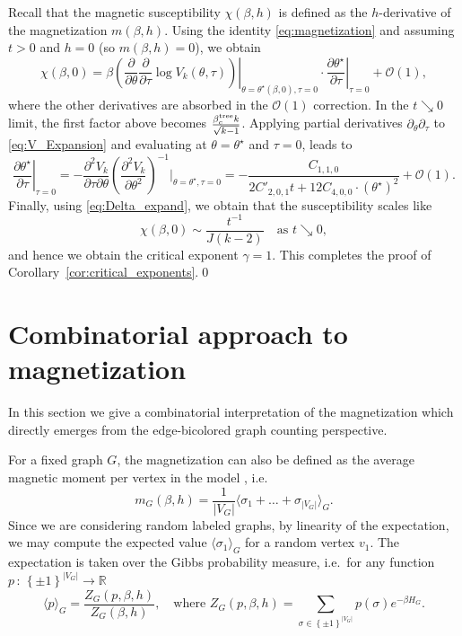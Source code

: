 \documentclass{article}
\numberwithin{theorem}{section}
\theoremstyle{remark}
\newcommand{\RR}{\mathbb{R}}
\renewcommand{\O}{\mathcal{O}}
\begin{document}
Recall that the magnetic susceptibility $\chi(\beta,h)$ is defined as the $h$-derivative of the magnetization $m(\beta,h)$. Using the identity \eqref{eq:magnetization} and assuming $t>0$ and $h=0$ (so $m(\beta,h) = 0$), we obtain
\[
  \chi(\beta,0) = \beta \left.\left(\frac{\partial}{\partial\theta} \frac{\partial}{\partial\tau} \log V_k(\theta,\tau) \right) \right|_{\theta=\theta^\star(\beta,0), \tau=0} \cdot \left. \frac{\partial \theta^\star}{\partial \tau} \right|_{\tau=0} + \O(1),
\]
where the other derivatives are absorbed in the $\O(1)$ correction. In the $t\searrow 0$ limit, the first factor above becomes $\tfrac{\beta_c^{\rm tree} k}{\sqrt{k-1}}$. Applying partial derivatives $\partial_\theta \partial_\tau$ to \eqref{eq:V_Expansion} and evaluating at $\theta=\theta^\star$ and $\tau=0$, leads to 
\[    
  \left. \frac{\partial \theta^\star}{\partial \tau} \right|_{\tau=0} = - \frac{\partial^2 V_k}{\partial \tau \partial \theta} \left(\frac{\partial^2 V_k}{\partial \theta^2}\right)^{-1} \Bigg|_{\theta=\theta^\star, \tau=0} = -\frac{C_{1,1,0}}{2C'_{2,0,1}t + 12C_{4,0,0}\cdot(\theta^\star)^2} + \O(1).
\]
Finally, using \eqref{eq:Delta_expand}, we obtain that the susceptibility scales like
\[
  \chi(\beta, 0) \sim \frac{t^{-1}}{J(k-2)} \quad\text{as } t\searrow 0,
\]
and hence we obtain the critical exponent $\gamma=1$. This completes the proof of Corollary~\ref{cor:critical_exponents}.\qed


\section{Combinatorial approach to magnetization}
\label{sec:magnetization_combinatorial}

In this section we give a combinatorial interpretation of the magnetization which directly emerges from the edge-bicolored graph counting perspective.\par

For a fixed graph $G$, the magnetization can also be defined as the average magnetic moment per vertex in the model \cite[(1.7.12)]{baxter1982exactly}, i.e.\ 
\[
  m_G(\beta,h) = \frac{1}{|V_G|} \langle \sigma_1 + \dots + \sigma_{|V_G|} \rangle_G.
\]
Since we are considering random labeled graphs, by linearity of the expectation, we may compute the expected value $\langle \sigma_1 \rangle_G$ for a random vertex $v_1$. The expectation is taken over the Gibbs probability measure, i.e.\ for any function $p\,:\, \left\{ \pm 1 \right\}^{|V_G|}\rightarrow\RR$
\[
  \langle p \rangle_G = \frac{Z_G(p,\beta,h)}{Z_G(\beta, h)},\quad \text{where } Z_G(p,\beta,h) = \!\!\!\sum_{\sigma\in \left\{ \pm 1\right\}^{|V_G|}} p(\sigma) e^{-\beta H_G}.
\]
\end{document}
